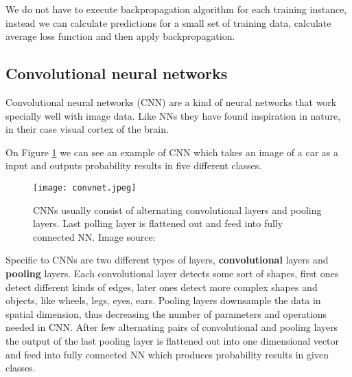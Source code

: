 We do not have to execute backpropagation algorithm for each training instance, instead we can calculate predictions for a small set of training data, calculate average loss function and then apply backpropagation.


\subsection{ Convolutional neural networks}

Convolutional neural networks (CNN) are a kind of neural networks that work specially well with image data.
Like NNs they have found inspiration in nature, in their case visual cortex of the brain.\footnotemark



On Figure \ref{convnet} we can see an example of CNN which takes an image of a car as a input and outputs probability results in five different classes.
\newline

\begin{figure}[ht]
        \centering
        \texttt{[image: convnet.jpeg]} 
        \caption{CNNs usually consist of alternating convolutional layers and pooling layers. Last polling layer is flattened out and feed into fully connected NN. Image source:\cite{cs231n}}
        \label{convnet}
\end{figure}

Specific to CNNs are two different types of layers, \textbf{convolutional} layers and \textbf{pooling} layers.
Each convolutional layer detects some sort of shapes, first ones detect different kinds of edges, later ones detect more complex shapes and objects, like wheels, legs, eyes, ears.
Pooling layers downsample the data in spatial dimension, thus decreasing the number of parameters and operations needed in CNN.
After few alternating pairs of convolutional and pooling layers the output of the last pooling layer is flattened out into one dimensional vector and feed into fully connected NN which produces probability results in given classes.

